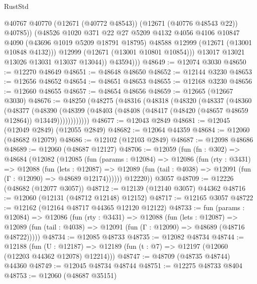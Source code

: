 \begin{lexlean}{RustStd}
\begin{coremodule}
                    @40767
                    @40770
                    (@12671 (@40772 @48543))
                    (@12671 (@40776 @48543 @22))
                    @40785))
                (@48526
                  @1020
                  @371
                  @22
                  @27
                  @5209
                  @4132
                  @4056
                  @4106
                  @10847
                  @4090
                  (@43696 @1019 @5209 @18791 @18795)
                  @48588
                  @12999
                  (@12671 (@13001 @10848 @4132)))
                @12999
                (@12671 (@13001 @10801 @10854)))
              @13017
              @13021
              @13026
              @13031
              @13037
              @13044))
          @43594)))
@48649 := @12074 @3030
@48650 := @12270 @48649
@48651 := @48648 @48650
@48652 := @12144 @3230
@48653 := @12656 @48652
@48654 := @48651 @48653
@48655 := @12168 @3230
@48656 := @12660 @48655
@48657 := @48654 @48656
@48659 := @12665 (@12667 @3030)
@48676 := @48250
    (@48275
      (@48316
        (@48318
          (@48320
            (@48337
              (@48360
                (@48377
                  (@48390
                    (@48399
                      (@48403 (@48408 (@48417 (@48420 (@48657 @48659 @12864)) @13449))))))))))))
@48677 := @12043 @2849
@48681 := @12045 (@12049 @2849) (@12055 @2849)
@48682 := @12064 @44359
@48684 := @12060 (@48682 @12079)
@48686 := @12102 (@12103 @2849)
@48687 := @12098 @48686
@48689 := @12060 (@48687 @12127)
@48706 := @12059
    (fun (fn : @302) =>
    @48684
      (@12082
        (@12085
          (fun (params : @12084) =>
          @12086
            (fun (rty : @3431) =>
            @12088
              (fun (lets : @12087) =>
              @12089 (fun (tail : @4038) => @12091 (fun (Γ : @12090) => @48689 @12174))))))
        @12220))
    @3057
@48709 := @12226 (@48682 (@12077 @3057))
@48712 := @12139 (@12140 @3057) @44362
@48716 := @12060 (@12131 (@48712 @12148) @12152)
@48717 := @12165 @3057
@48722 := @12162 (@12164 @48717 @44365 @12120 @12122)
@48733 := fun (params : @12084) =>
  @12086
    (fun (rty : @3431) =>
    @12088
      (fun (lets : @12087) =>
      @12089 (fun (tail : @4038) => @12091 (fun (Γ : @12090) => @48689 (@48716 @48722)))))
@48734 := @12085 @48733
@48735 := @12082 @48734
@48744 := @12188
    (fun (U : @12187) => @12189 (fun (t : @7) => @12197 (@12060 (@12203 @44362 @12078) @12214)))
@48747 := @48709 (@48735 @48744) @44360
@48749 := @12045 @48734 @48744
@48751 := @12275 @48733 @8404
@48753 := @12060 (@48687 @35151)

\end{coremodule}
\end{lexlean}
